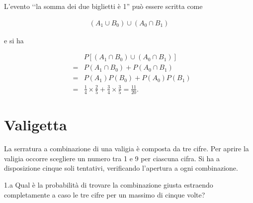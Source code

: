 \documentclass[
  11pt,
]{book}
\theoremstyle{mytheoremstyle}
\theoremstyle{mydefstyle}
\newenvironment{sol}
  {
  \begin{tcolorbox}[enhanced,breakable,arc=0.1mm,boxrule=1pt,colback=white,colframe=iblue,
  title=\bf \fontfamily{lmss}\selectfont \hspace{.5 cm} Soluzione,drop fuzzy shadow]

}{
\end{tcolorbox}
  }
\begin{document}
\begin{sol}
L'evento \lq\lq la somma dei due biglietti è 1'' può
essere scritta come

\begin{eqnarray*}
(A_1 \cup B_0) \cup (A_0 \cap B_1)
\end{eqnarray*}

e si ha

\begin{eqnarray*}
& & P[(A_1\cap B_0)\cup(A_0\cap B_1)] \\
&=& P(A_1\cap B_0) + P(A_0\cap B_1) \\
&=& P(A_1) P(B_0) + P(A_0) P(B_1) \\
&=& \frac{1}{4}\times \frac{2}{5} + \frac{3}{4}\times \frac{3}{5}
 =  \frac{11}{20}.
\end{eqnarray*}

\end{sol}

\section{Valigetta}\label{valigetta}

La serratura a combinazione di una valigia è composta da tre cifre.
Per aprire la valigia occorre scegliere un numero tra 1 e 9 per
ciascuna cifra.
Si ha a disposizione cinque soli tentativi, verificando l'apertura
a ogni combinazione.

1.a Qual è la probabilità di trovare la combinazione giusta
estraendo completamente a caso le tre cifre per un massimo di
cinque volte?
\end{document}
